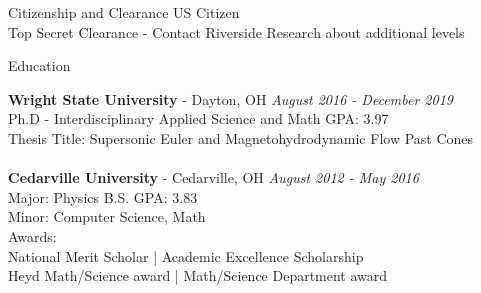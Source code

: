 \documentclass{resume} %
\begin{document}
\begin{rSection}{Citizenship and Clearance}
US Citizen
\\Top Secret Clearance - Contact Riverside Research about additional levels

\end{rSection}


\begin{rSection}{Education}

{\bf Wright State University} - Dayton, OH \hfill {\em August 2016 - December 2019} 
\\ Ph.D - Interdisciplinary Applied Science and Math \hfill {GPA: 3.97}
\\ Thesis Title: Supersonic Euler and Magnetohydrodynamic Flow Past Cones\\
\\{\bf Cedarville University} - Cedarville, OH \hfill {\em August 2012 - May 2016} 
\\ Major: Physics B.S. \hfill { GPA: 3.83 }
\\ Minor: Computer Science, Math \smallskip \\
Awards: \\ National Merit Scholar | Academic Excellence Scholarship \\ Heyd Math/Science award | Math/Science Department award



\end{rSection}
\end{document}
